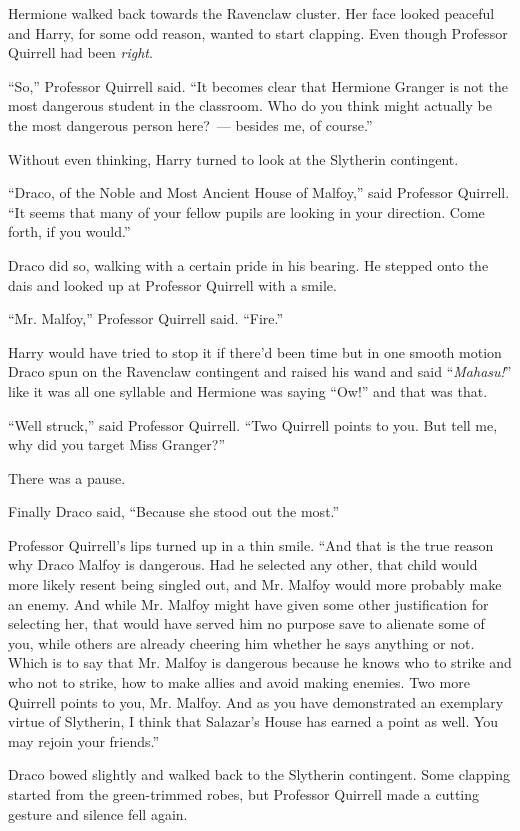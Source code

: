 Hermione walked back towards the Ravenclaw cluster. Her face looked peaceful and Harry, for some odd reason, wanted to start clapping. Even though Professor Quirrell had been \emph{right}.

``So,'' Professor Quirrell said. ``It becomes clear that Hermione Granger is not the most dangerous student in the classroom. Who do you think might actually be the most dangerous person here?~--- besides me, of course.''

Without even thinking, Harry turned to look at the Slytherin contingent.

``Draco, of the Noble and Most Ancient House of Malfoy,'' said Professor Quirrell. ``It seems that many of your fellow pupils are looking in your direction. Come forth, if you would.''

Draco did so, walking with a certain pride in his bearing. He stepped onto the dais and looked up at Professor Quirrell with a smile.

``Mr. Malfoy,'' Professor Quirrell said. ``Fire.''

Harry would have tried to stop it if there'd been time but in one smooth motion Draco spun on the Ravenclaw contingent and raised his wand and said ``\emph{Mahasu!}'' like it was all one syllable and Hermione was saying ``Ow!'' and that was that.

``Well struck,'' said Professor Quirrell. ``Two Quirrell points to you. But tell me, why did you target Miss Granger?''

There was a pause.

Finally Draco said, ``Because she stood out the most.''

Professor Quirrell's lips turned up in a thin smile. ``And that is the true reason why Draco Malfoy is dangerous. Had he selected any other, that child would more likely resent being singled out, and Mr. Malfoy would more probably make an enemy. And while Mr. Malfoy might have given some other justification for selecting her, that would have served him no purpose save to alienate some of you, while others are already cheering him whether he says anything or not. Which is to say that Mr. Malfoy is dangerous because he knows who to strike and who not to strike, how to make allies and avoid making enemies. Two more Quirrell points to you, Mr. Malfoy. And as you have demonstrated an exemplary virtue of Slytherin, I think that Salazar's House has earned a point as well. You may rejoin your friends.''

Draco bowed slightly and walked back to the Slytherin contingent. Some clapping started from the green-trimmed robes, but Professor Quirrell made a cutting gesture and silence fell again.

